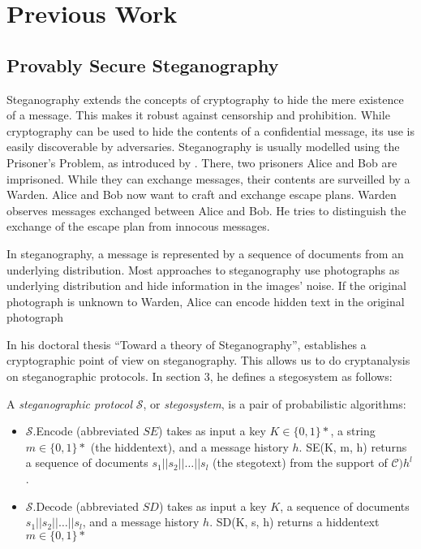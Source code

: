\chapter{Previous Work}

\section{Provably Secure Steganography}
\label{sec:prov-sec-steg}

Steganography extends the concepts of cryptography to hide the mere existence of a message.
This makes it robust against censorship and prohibition.
While cryptography can be used to hide the contents of a confidential message, its use is easily discoverable by adversaries.
Steganography is usually modelled using the Prisoner's Problem, as introduced by \cite{Simmons1983}.
There, two prisoners Alice and Bob are imprisoned.
While they can exchange messages, their contents are surveilled by a Warden.
Alice and Bob now want to craft and exchange escape plans.
Warden observes messages exchanged between Alice and Bob.
He tries to distinguish the exchange of the escape plan from innocous messages.

In steganography, a message is represented by a sequence of documents from an underlying distribution.
Most approaches to steganography use photographs as underlying distribution and hide information in the images' noise.
If the original photograph is unknown to Warden, Alice can encode hidden text in the original photograph

In his doctoral thesis ``Toward a theory of Steganography'', \cite{Hopper2004} establishes a cryptographic point of view on steganography. 
This allows us to do cryptanalysis on steganographic protocols.
In section 3, he defines a stegosystem as follows:

\begin{definition}
A \emph{steganographic protocol} $\mathcal{S}$, or \emph{stegosystem}, is a pair of probabilistic algorithms:

\begin{itemize}
	\item $\mathcal{S}$.Encode (abbreviated $SE$) takes as input a key $K \in \{0,1\}*$, a string $m \in \{0,1\}*$ (the hiddentext), and a message history $h$.
		SE(K, m, h) returns a sequence of documents $s_1||s_2||\dots||s_l$ (the stegotext) from the support of $\mathcal{C})h^l$.
	\item $\mathcal{S}$.Decode (abbreviated $SD$) takes as input a key $K$, a sequence of documents $s_1||s_2||\dots||s_l$, and a message history $h$.
		SD(K, s, h) returns a hiddentext $m \in \{0,1\}*$
\end{itemize}
\end{definition}


